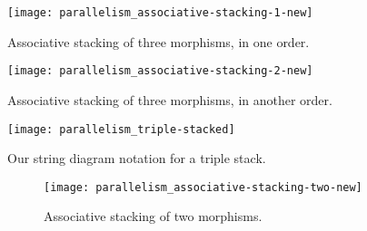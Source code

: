 \begin{marginfigure}[]
    \centering
    \texttt{[image: parallelism\_associative-stacking-1-new]}
    \caption{Associative stacking of three morphisms, in one order.}
    \label{fig:associative-stacking-1-new}
\end{marginfigure}

\begin{marginfigure}
    \centering
    \texttt{[image: parallelism\_associative-stacking-2-new]}
    \caption{Associative stacking of three morphisms, in another order.}
    \label{fig:associative-stacking-2-new}
\end{marginfigure}

\begin{marginfigure}
    \centering
    \texttt{[image: parallelism\_triple-stacked]}
    \caption{Our string diagram notation for a triple stack.}
    \label{fig:triple-stacked}
\end{marginfigure}

\begin{figure}[h!]
    \centering
    \texttt{[image: parallelism\_associative-stacking-two-new]}
    \caption{Associative stacking of two morphisms.}
    \label{fig:double-stacked-new}
\end{figure}

